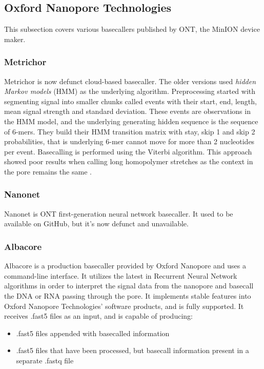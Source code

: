 \documentclass[times, utf8, diplomski, english]{fer}
\begin{document}
\subsection{Oxford Nanopore Technologies}
This subsection covers various basecallers published by ONT, the MinION device maker.
\subsubsection{Metrichor}

Metrichor is now defunct cloud-based basecaller. The older versions used \textit{hidden Markov models} (HMM) as the underlying algorithm. Preprocessing started with segmenting signal into smaller chunks called events with their start, end, length, mean signal strength and standard deviation. These events are observations in the HMM model, and the underlying generating hidden sequence is the sequence of 6-mers. They build their HMM transition matrix with stay, skip 1 and skip 2 probabilities, that is underlying 6-mer cannot move for more than 2 nucleotides per event. Basecalling is performed using the Viterbi algorithm. This approach showed poor results when calling long homopolymer stretches as the context in the pore remains the same \cite{homopolymers}\cite{homopolimeri_analiza}.

\subsubsection{Nanonet}
Nanonet is ONT first-generation neural network basecaller. It used to be available on GitHub, but it's now defunct and unavailable.

\subsubsection{Albacore}
Albacore is a production basecaller provided by Oxford Nanopore and uses a command-line interface. It
utilizes the latest in Recurrent Neural Network algorithms in order to interpret the signal data from the
nanopore and basecall the DNA or RNA passing through the pore. It implements stable features into
Oxford Nanopore Technologies’ software products, and is fully supported. It receives .fast5 files as an
input, and is capable of producing: 
\begin{itemize}
    \item .fast5 files appended with basecalled information
    \item .fast5 files that have been processed, but basecall information present in a separate .fastq file
\end{itemize}
\end{document}
